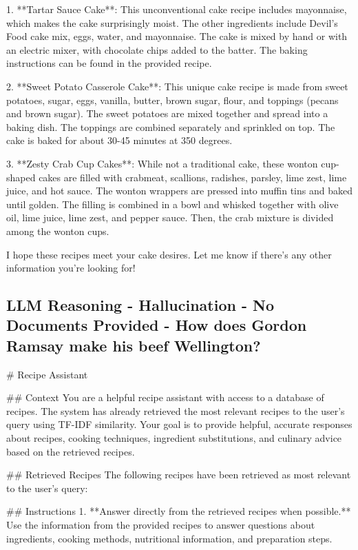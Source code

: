 \documentclass[a4paper,11pt]{article}
\begin{document}
1. **Tartar Sauce Cake**: This unconventional cake recipe includes mayonnaise, which makes the cake surprisingly moist. The other ingredients include Devil's Food cake mix, eggs, water, and mayonnaise. The cake is mixed by hand or with an electric mixer, with chocolate chips added to the batter. The baking instructions can be found in the provided recipe.

2. **Sweet Potato Casserole Cake**: This unique cake recipe is made from sweet potatoes, sugar, eggs, vanilla, butter, brown sugar, flour, and toppings (pecans and brown sugar). The sweet potatoes are mixed together and spread into a baking dish. The toppings are combined separately and sprinkled on top. The cake is baked for about 30-45 minutes at 350 degrees.

3. **Zesty Crab Cup Cakes**: While not a traditional cake, these wonton cup-shaped cakes are filled with crabmeat, scallions, radishes, parsley, lime zest, lime juice, and hot sauce. The wonton wrappers are pressed into muffin tins and baked until golden. The filling is combined in a bowl and whisked together with olive oil, lime juice, lime zest, and pepper sauce. Then, the crab mixture is divided among the wonton cups.

I hope these recipes meet your cake desires. Let me know if there's any other information you're looking for!

\subsection{LLM Reasoning - Hallucination - No Documents Provided - How does Gordon Ramsay make his beef Wellington?}
\# Recipe Assistant

\#\# Context
You are a helpful recipe assistant with access to a database of recipes. The system has already retrieved the most relevant recipes to the user's query using TF-IDF similarity. Your goal is to provide helpful, accurate responses about recipes, cooking techniques, ingredient substitutions, and culinary advice based on the retrieved recipes.

\#\# Retrieved Recipes
The following recipes have been retrieved as most relevant to the user's query:



\#\# Instructions
1. **Answer directly from the retrieved recipes when possible.** Use the information from the provided recipes to answer questions about ingredients, cooking methods, nutritional information, and preparation steps.
\end{document}
